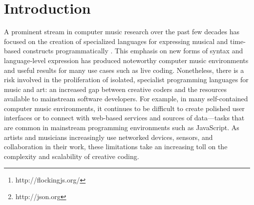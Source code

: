 \documentclass{article}
\title{\papertitle}
\begin{document}
\sloppy
%
\capstartfalse
\maketitle
\capstarttrue
%
\begin{abstract}
Flocking\footnote{http://flockingjs.org/} is a framework for audio synthesis and music composition written in JavaScript. It takes a unique approach to solving several of the common architectural problems faced by computer music environments, emphasizing a declarative style that is closely aligned with the principles of the web.

In Flocking, instruments and scores are defined as JavaScript Object Notation (JSON) objects. JSON is a subset of the JavaScript language that is used widely across the web for exchanging data.\footnote{http://json.org} Flocking's goal is to enable the growth of an ecosystem of tools that can easily parse and understand the logic and semantics of digital instruments by representing the basic building blocks of synthesis declaratively. This is particularly useful for supporting generative composition (where programs generate new instruments and scores algorithmically), graphical tools (for programmers and non-programmers alike to collaborate), and new modes of social programming that allow musicians to easily adapt, extend, and rework existing instruments without having to ``fork" their code.

Flocking provides a robust, optimized, and well-tested architecture that explicitly supports extensibility and long-term growth. Flocking runs in nearly any modern JavaScript environment, including desktop and mobile browsers (Chrome, Firefox, and Safari), as well as on embedded devices with Node.js.

\end{abstract}

\section{Introduction}\label{sec:introduction}

A prominent stream in computer music research over the past few decades has focused on the creation of specialized languages for expressing musical and time-based constructs programmatically \cite{dannenberg2002language,wang2003chuck,mccartney1996supercollider,orlarey2009faust}. This emphasis on new forms of syntax and language-level expression has produced noteworthy computer music environments and useful results for many use cases such as live coding. Nonetheless, there is a risk involved in the proliferation of isolated, specialist programming languages for music and art: an increased gap between creative coders and the resources available to mainstream software developers. For example, in many self-contained computer music environments, it continues to be difficult to create polished user interfaces or to connect with web-based services and sources of data---tasks that are common in mainstream programming environments such as JavaScript. As artists and musicians increasingly use networked devices, sensors, and collaboration in their work, these limitations take an increasing toll on the complexity and scalability of creative coding.
\end{document}
